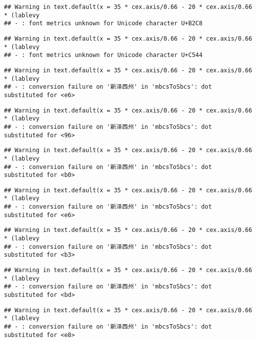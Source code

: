 \documentclass[
]{article}
\begin{document}
\begin{verbatim}
## Warning in text.default(x = 35 * cex.axis/0.66 - 20 * cex.axis/0.66 * (lablevy
## - : font metrics unknown for Unicode character U+B2C8
\end{verbatim}

\begin{verbatim}
## Warning in text.default(x = 35 * cex.axis/0.66 - 20 * cex.axis/0.66 * (lablevy
## - : font metrics unknown for Unicode character U+C544
\end{verbatim}

\begin{verbatim}
## Warning in text.default(x = 35 * cex.axis/0.66 - 20 * cex.axis/0.66 * (lablevy
## - : conversion failure on '新泽西州' in 'mbcsToSbcs': dot substituted for <e6>
\end{verbatim}

\begin{verbatim}
## Warning in text.default(x = 35 * cex.axis/0.66 - 20 * cex.axis/0.66 * (lablevy
## - : conversion failure on '新泽西州' in 'mbcsToSbcs': dot substituted for <96>
\end{verbatim}

\begin{verbatim}
## Warning in text.default(x = 35 * cex.axis/0.66 - 20 * cex.axis/0.66 * (lablevy
## - : conversion failure on '新泽西州' in 'mbcsToSbcs': dot substituted for <b0>
\end{verbatim}

\begin{verbatim}
## Warning in text.default(x = 35 * cex.axis/0.66 - 20 * cex.axis/0.66 * (lablevy
## - : conversion failure on '新泽西州' in 'mbcsToSbcs': dot substituted for <e6>
\end{verbatim}

\begin{verbatim}
## Warning in text.default(x = 35 * cex.axis/0.66 - 20 * cex.axis/0.66 * (lablevy
## - : conversion failure on '新泽西州' in 'mbcsToSbcs': dot substituted for <b3>
\end{verbatim}

\begin{verbatim}
## Warning in text.default(x = 35 * cex.axis/0.66 - 20 * cex.axis/0.66 * (lablevy
## - : conversion failure on '新泽西州' in 'mbcsToSbcs': dot substituted for <bd>
\end{verbatim}

\begin{verbatim}
## Warning in text.default(x = 35 * cex.axis/0.66 - 20 * cex.axis/0.66 * (lablevy
## - : conversion failure on '新泽西州' in 'mbcsToSbcs': dot substituted for <e8>
\end{verbatim}
\end{document}
